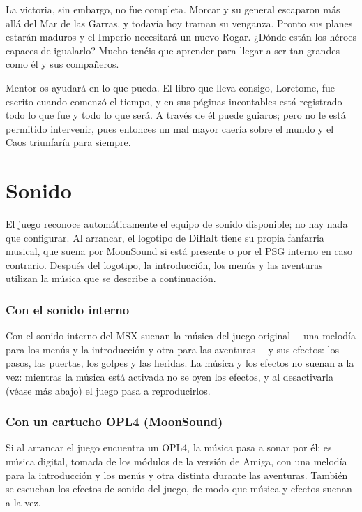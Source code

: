 La victoria, sin embargo, no fue completa. Morcar y su general escaparon
más allá del Mar de las Garras, y todavía hoy traman su venganza. Pronto
sus planes estarán maduros y el Imperio necesitará un nuevo Rogar. ¿Dónde
están los héroes capaces de igualarlo? Mucho tenéis que aprender para
llegar a ser tan grandes como él y sus compañeros.

Mentor os ayudará en lo que pueda. El libro que lleva consigo, Loretome,
fue escrito cuando comenzó el tiempo, y en sus páginas incontables está
registrado todo lo que fue y todo lo que será. A través de él puede
guiaros; pero no le está permitido intervenir, pues entonces un mal mayor
caería sobre el mundo y el Caos triunfaría para siempre.

\chapter{Sonido}



El juego reconoce automáticamente el equipo de sonido disponible; no hay
nada que configurar. Al arrancar, el logotipo de DiHalt tiene su propia
fanfarria musical, que suena por MoonSound si está presente o por el PSG
interno en caso contrario. Después del logotipo, la introducción, los menús
y las aventuras utilizan la música que se describe a continuación.

\subsection{Con el sonido interno}

Con el sonido interno del MSX suenan la música
del juego original ---una melodía para los menús y la introducción y otra
para las aventuras--- y sus efectos: los pasos, las puertas, los golpes y
las heridas. La música y los efectos no suenan a la vez: mientras la música está activada no se oyen los efectos, y al
desactivarla (véase más abajo) el juego pasa a reproducirlos.

\subsection{Con un cartucho OPL4 (MoonSound)}

Si al arrancar el juego encuentra un OPL4, la música pasa a sonar por él:
es música digital, tomada de los módulos de la versión de Amiga, con una
melodía para la introducción y los menús y otra distinta durante las
aventuras. También se escuchan los efectos de sonido del juego, de modo que música
y efectos suenan a la vez.

